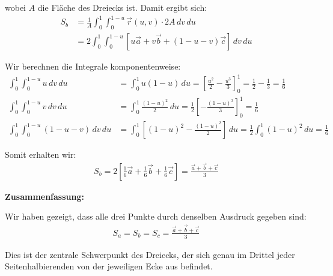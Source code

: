 \documentclass{article}
\begin{document}
wobei $A$ die Fläche des Dreiecks ist. Damit ergibt sich:
\begin{align}
S_b &= \frac{1}{A} \int_0^1 \int_0^{1-u} \vec{r}(u,v) \cdot 2A \, dv \, du\\
&= 2 \int_0^1 \int_0^{1-u} [u\vec{a} + v\vec{b} + (1-u-v)\vec{c}] \, dv \, du
\end{align}

Wir berechnen die Integrale komponentenweise:
\begin{align}
\int_0^1 \int_0^{1-u} u \, dv \, du &= \int_0^1 u(1-u) \, du = \left[\frac{u^2}{2} - \frac{u^3}{3}\right]_0^1 = \frac{1}{2} - \frac{1}{3} = \frac{1}{6}\\
\int_0^1 \int_0^{1-u} v \, dv \, du &= \int_0^1 \frac{(1-u)^2}{2} \, du = \frac{1}{2}\left[-\frac{(1-u)^3}{3}\right]_0^1 = \frac{1}{6}\\
\int_0^1 \int_0^{1-u} (1-u-v) \, dv \, du &= \int_0^1 \left[(1-u)^2 - \frac{(1-u)^2}{2}\right] \, du = \frac{1}{2} \int_0^1 (1-u)^2 \, du = \frac{1}{6}
\end{align}

Somit erhalten wir:
\begin{align}
S_b = 2\left[\frac{1}{6}\vec{a} + \frac{1}{6}\vec{b} + \frac{1}{6}\vec{c}\right] = \frac{\vec{a} + \vec{b} + \vec{c}}{3}
\end{align}

\textbf{Zusammenfassung:}

Wir haben gezeigt, dass alle drei Punkte durch denselben Ausdruck gegeben sind:
\begin{align}
S_a = S_b = S_c = \frac{\vec{a} + \vec{b} + \vec{c}}{3}
\end{align}

Dies ist der zentrale Schwerpunkt des Dreiecks, der sich genau im Drittel jeder Seitenhalbierenden von der jeweiligen Ecke aus befindet.
\end{document}

